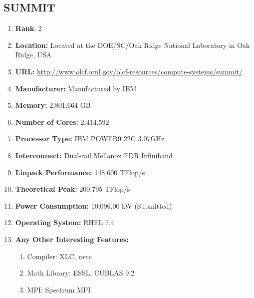 \documentclass[12pt, a4paper, fleqn, titlepage]{article}
\begin{document}
    \subsection{SUMMIT}
        \begin{flushleft}
            \begin{enumerate}[\textbullet]
                \item \textbf{Rank}: 2
                \item \textbf{Location:} 
                    Located at the DOE/SC/Oak Ridge National Laboratory in Oak Ridge, USA
                \item \textbf{URL:} 
                    \url{http://www.olcf.ornl.gov/olcf-resources/compute-systems/summit/}
                \item \textbf{Manufacturer:} Manufactured by IBM
                \item \textbf{Memory:} 2,801,664 GB
                \item \textbf{Number of Cores:} 2,414,592
                \item \textbf{Processor Type:} IBM POWER9 22C 3.07GHz
                \item \textbf{Interconnect:} Dual-rail Mellanox EDR Infiniband
                \item \textbf{Linpack Performance:} 148,600 TFlop/s
                \item \textbf{Theoretical Peak:} 200,795 TFlop/s
                \item \textbf{Power Consumption:} 10,096.00 kW (Submitted)
                \item \textbf{Operating System:} RHEL 7.4
                \item \textbf{Any Other Interesting Features:}
                    \begin{enumerate}
                        \item Compiler: XLC, nvcc
                        \item Math Library: ESSL, CUBLAS 9.2
                        \item MPI: Spectrum MPI
                    \end{enumerate}
            \end{enumerate}
        \end{flushleft}
    
    
\end{document}
